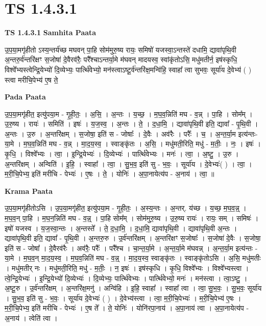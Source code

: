 \documentclass[17pt]{extarticle}
\begin{document}
\section{ TS 1.4.3.1 }

\textbf{TS 1.4.3.1 } \newline
\textbf{Samhita Paata} \newline

उ॒प॒या॒मगृ॑हीतो ऽस्य॒न्तर्य॑च्छ मघवन् पा॒हि सोम॑मुरु॒ष्य रायः॒ समिषो॑ यजस्वा॒ऽन्तस्ते॑ दधामि॒ द्यावा॑पृथि॒वी अ॒न्तरु॒र्व॑न्तरि॑क्षꣳ स॒जोषा॑ दे॒वैरव॑रैः॒ परै᳚श्चाऽन्तर्या॒मे म॑घवन् मादयस्व॒ स्वांकृ॑तोऽसि॒ मधु॑मतीर्न॒ इष॑स्कृधि॒ विश्वे᳚भ्यस्त्वेन्द्रि॒येभ्यो॑ दि॒व्येभ्यः॒ पार्त्थि॑वेभ्यो॒ मन॑स्त्वाऽष्टू॒र्व॑न्तरि॑क्ष॒मन्वि॑हि॒ स्वाहा᳚ त्वा सुभवः॒ सूर्या॑य दे॒वेभ्य॑ ( ) स्त्वा मरीचि॒पेभ्य॑ ए॒ष ते॒ \newline

\textbf{Pada Paata} \newline

उ॒प॒या॒मगृ॑हीत॒ इत्यु॑पया॒म - गृ॒ही॒तः॒ । अ॒सि॒ । अ॒न्तः । य॒च्छ॒ । म॒घ॒व॒न्निति॑ मघ - व॒न्न् । पा॒हि । सोम᳚म् । उ॒रु॒ष्य । रायः॑ । समिति॑ । इषः॑ । य॒ज॒स्व॒ । अ॒न्तः । ते॒ । द॒धा॒मि॒ । द्यावा॑पृथि॒वी इति॒ द्यावा᳚ - पृ॒थि॒वी । अ॒न्तः । उ॒रु । अ॒न्तरि॑क्षम् । स॒जोषा॒ इति॑ स - जोषाः᳚ । दे॒वैः । अव॑रैः । परैः᳚ । च॒ । अ॒न्त॒र्या॒म इत्य॑न्तः-या॒मे । म॒घ॒व॒न्निति॑ मघ - व॒न्न् । मा॒द॒य॒स्व॒ । स्वाङ्कृ॑तः । अ॒सि॒ । मधु॑मती॒रिति॒ मधु॑ - म॒तीः॒ । नः॒ । इषः॑ । कृ॒धि॒ । विश्वे᳚भ्यः । त्वा॒ । इ॒न्द्रि॒येभ्यः॑ । दि॒व्येभ्यः॑ । पार्त्थि॑वेभ्यः । मनः॑ । त्वा॒ । अ॒ष्टु॒ । उ॒रु । अ॒न्तरि॑क्षम् । अन्विति॑ । इ॒हि॒ । स्वाहा᳚ । त्वा॒ । सु॒भ॒व॒ इति॑ सु - भ॒वः॒ । सूर्या॑य । दे॒वेभ्यः॑( ) । त्वा॒ । म॒री॒चि॒पेभ्य॒ इति॑ मरीचि - पेभ्यः॑ । ए॒षः । ते॒ । योनिः॑ । अ॒पा॒नायेत्य॑प - अ॒नाय॑ । त्वा॒ ॥  \newline


\textbf{Krama Paata} \newline

उ॒प॒या॒मगृ॑हीतोऽसि । उ॒प॒या॒मगृ॑हीत॒ इत्यु॑पया॒म - गृ॒ही॒तः॒ । अ॒स्य॒न्तः । अ॒न्तर्. य॑च्छ । य॒च्छ॒ म॒घ॒व॒न्न्॒ । म॒घ॒व॒न् पा॒हि । म॒घ॒न॒न्निति॑ मघ - व॒न्न्॒ । पा॒हि सोम᳚म् । सोम॑मुरु॒ष्य । उ॒रु॒ष्य रायः॑ । रायः॒ सम् । समिषः॑ । इषो॑ यजस्व । य॒ज॒स्वा॒न्तः । अ॒न्तस्ते᳚ । ते॒ द॒धा॒मि॒ । द॒धा॒मि॒ द्यावा॑पृथि॒वी । द्यावा॑पृथि॒वी अ॒न्तः । द्यावा॑पृथि॒वी इति॒ द्यावा᳚ - पृ॒थि॒वी । अ॒न्तरु॒रु । उ॒र्व॑न्तरि॑क्षम् । अ॒न्तरि॑क्षꣳ स॒जोषाः᳚ । स॒जोषा॑ दे॒वैः । स॒जोषा॒ इति॑ स - जोषा᳚ । दे॒वैरव॑रैः । अव॑रैः॒ परैः᳚ । परै᳚श्च । चा॒न्त॒र्या॒मे । अ॒न्त॒र्या॒मे म॑घवन्न् । अ॒न्त॒र्या॒म इत्य॑न्तः - या॒मे । म॒घ॒व॒न् मा॒द॒य॒स्व॒ । म॒घ॒व॒न्निति॑ मघ - व॒न्न्॒ । मा॒द॒य॒स्व॒ स्वाङ्कृ॑तः । स्वाङ्कृ॑तोऽसि । अ॒सि॒ मधु॑मतीः । मधु॑मतीर् नः । मधु॑मती॒रिति॒ मधु॑ - म॒तीः॒ । न॒ इषः॑ । इष॑स्कृधि । कृ॒धि॒ विश्वे᳚भ्यः । विश्वे᳚भ्यस्त्वा । त्वे॒न्द्रि॒येभ्यः॑ । इ॒न्द्रि॒येभ्यो॑ दि॒व्येभ्यः॑ । दि॒व्येभ्यः॒ पार्त्थि॑वेभ्यः । पार्त्थि॑वेभ्यो॒ मनः॑ । मन॑स्त्वा । त्वा॒ऽष्टु॒ । अ॒ष्टू॒रु । उ॒र्व॑न्तरि॑क्षम् । अ॒न्तरि॑क्ष॒मनु॑ । अन्वि॑हि । इ॒हि॒ स्वाहा᳚ । स्वाहा᳚ त्वा । त्वा॒ सु॒भ॒वः॒ । सु॒भ॒वः॒ सूर्या॑य । सु॒भ॒व॒ इति॑ सु - भ॒वः॒ । सूर्या॑य दे॒वेभ्यः॑ ( ) । दे॒वेभ्य॑स्त्वा । त्वा॒ म॒री॒चि॒पेभ्यः॑ । म॒री॒चि॒पेभ्य॑ ए॒षः । म॒री॒चि॒पेभ्य॒ इति॑ मरीचि - पेभ्यः॑ । ए॒ष ते᳚ । ते॒ योनिः॑ । योनि॑रपा॒नाय॑ । 
अ॒पा॒नाय॑ त्वा । अ॒पा॒नायेत्य॑प - अ॒नाय॑ । त्वेति॑ त्वा । \newline
\end{document}
